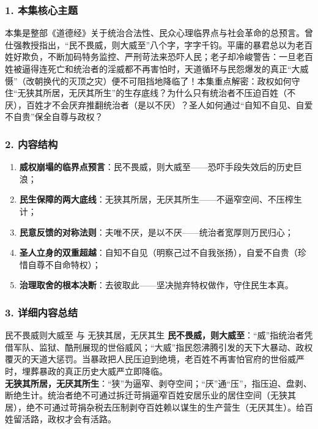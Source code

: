 \subsubsection{1. 本集核心主题}
本集是整部《道德经》关于统治合法性、民众心理临界点与社会革命的总预言。曾仕强教授指出，“民不畏威，则大威至”八个字，字字千钧。平庸的暴君总以为老百姓好欺负，不断加码特务监控、严刑苛法来恐吓人民；老子却冷峻警告：一旦老百姓被逼得连死亡和统治者的淫威都不再害怕时，天道循环与民怨爆发的真正“大威慑”（改朝换代的灭顶之灾）便不可阻挡地降临了！本集重点解密：政权如何守住“无狭其所居，无厌其所生”的生存底线？为什么只有统治者不压迫百姓（不厌），百姓才不会厌弃推翻统治者（是以不厌）？圣人如何通过“自知不自见、自爱不自贵”保全自尊与政权？

\subsubsection{2. 内容结构}
\begin{enumerate}
    \item \textbf{威权崩塌的临界点预言}：民不畏威，则大威至——恐吓手段失效后的历史巨浪；
    \item \textbf{民生保障的两大底线}：无狭其所居，无厌其所生——不逼窄空间、不压榨生计；
    \item \textbf{民意反馈的对称法则}：夫唯不厌，是以不厌——统治者宽厚则万民归心；
    \item \textbf{圣人立身的双重超越}：自知不自见（明察己过不自我张扬），自爱不自贵（珍惜自尊不自命特权）；
    \item \textbf{治理取舍的根本决断}：去彼取此——坚决抛弃特权做作，守住民生本真。
\end{enumerate}

\subsubsection{3. 详细内容总结}

\begin{ConceptBox}{民不畏威则大威至 与 无狭其居，无厌其生}
\textbf{民不畏威，则大威至}：“威”指统治者凭借军队、监狱、酷刑展现的世俗威风；“大威”指民怨沸腾引发的天下大暴动、政权覆灭的天道大惩罚。当暴政把人民压迫到绝境，老百姓不再害怕官府的世俗威严时，埋葬暴政的真正历史大威严立即降临。\\
\textbf{无狭其所居，无厌其所生}：“狭”为逼窄、剥夺空间；“厌”通“压”，指压迫、盘剥、断绝生计。统治者绝不可通过拆迁苛捐逼窄百姓安居乐业的居住空间（无狭其居），绝不可通过苛捐杂税去压制剥夺百姓赖以谋生的生产营生（无厌其生）。给百姓留活路，政权才会有活路。
\end{ConceptBox}


